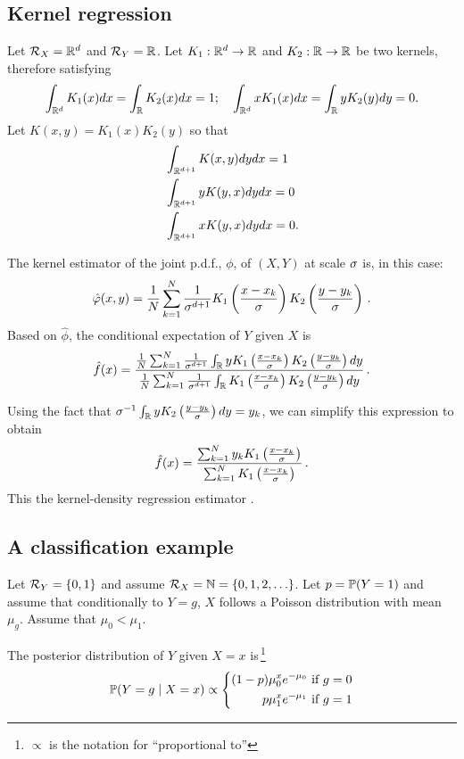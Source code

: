 \subsection{Kernel regression}
Let ${\mathcal R}_X = {\mathbb{R}}^{d}$ and ${\mathcal R}_Y = {\mathbb{R}}$.
Let $K_{1}: {\mathbb{R}}^{d} \to {\mathbb{R}}$ and $K_{2}: {\mathbb{R}} \to {\mathbb{R}}$ be two kernels, therefore satisfying
\[
\int_{{\mathbb{R}}^{d}} K_{1}(x) dx = \int_{{\mathbb{R}}} K_{2}(x) dx = 1;\quad \int_{{\mathbb{R}}^{d}} xK_{1}(x) dx = \int_{{\mathbb{R}}} yK_{2}(y) dy = 0.
\]
Let $K(x,y) = K_{1}(x) K_{2}(y)$ so that
\[
\begin{aligned}
&\int_{{\mathbb{R}}^{d+1}} K(x,y) dydx = 1\\
& \int_{{\mathbb{R}}^{d+1}} yK(y,x) dydx = 0\\
&\int_{{\mathbb{R}}^{d+1}} xK(y,x) dydx = 0.
\end{aligned}
\]

The kernel estimator of the  joint p.d.f., $\phi$, of $(X,Y)$ at
scale $\sigma$ is, in this case:
$$
\hat{\varphi}(x,y) = \frac{1}{N} \sum_{k=1}^N \frac{1}{\sigma^{d+1}}
K_1\left(\frac{x-x_k}{\sigma}\right)K_2\left(\frac{y-y_k}{\sigma}\right)\, .
$$
Based on $\hat\phi$, the conditional expectation of $Y$ given $X$ is
$$
{\hat{f}}(x) = \frac{\frac{1}{N} \sum_{k=1}^N \frac{1}{\sigma^{d+1}} \int_{{\mathbb{R}}} y
K_1\left(\frac{x-x_k}{\sigma}\right)K_2\left(\frac{y-y_k}{\sigma}\right)
dy}{\frac{1}{N} \sum_{k=1}^N \frac{1}{\sigma^{d+1}} \int_{{\mathbb{R}}} 
K_1\left(\frac{x-x_k}{\sigma}\right)K_2\left(\frac{y-y_k}{\sigma}\right) dy}\, .
$$

Using the fact that
$\sigma^{-1}\int_{{\mathbb{R}}} y
K_2\left(\frac{y-y_k}{\sigma}\right) dy = y_k$, we can simplify this expression to obtain
$$
{\hat{f}}(x) = \frac{ \sum_{k=1}^N  y_k 
K_1\left(\frac{x-x_k}{\sigma}\right)}{ \sum_{k=1}^N 
K_1\left(\frac{x-x_k}{\sigma}\right)} \,.
$$
This the kernel-density regression estimator \citep{nadaraya1964estimating,watson1964smooth}.

\subsection{A classification example}
Let ${\mathcal R}_Y = \{0,1\}$ and assume ${\mathcal R}_X = \mathbb N =  \{0,1,2,\ldots\}$.
Let $p = \bm{\mathbb P}(Y=1)$ and assume that conditionally to $Y=g$, $X$ follows a Poisson distribution with mean $\mu_{g}$. Assume that $\mu_{0 }< \mu_1$.

The posterior distribution of $Y$ given $X=x$ is\,\footnote{$\propto$ is the notation for ``proportional to''}
\[
\bm{\mathbb P}(Y=g\mid X=x) \propto \left\{
\begin{aligned}
(1-p)\mu_{0}^{x}e^{-\mu_0} \text{ if } g=0\\
p\mu_{1}^{x}e^{-\mu_1} \text{ if } g=1
\end{aligned}
\right.
\]

